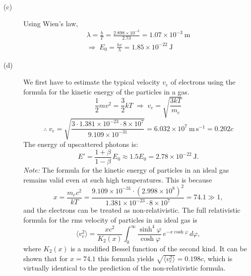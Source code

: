 \begin{description}
\item[(c)] Using Wien's law,
  \begin{gather*}
  \lambda = \frac{b}{T} = \frac{2.898 \times 10^{-3}}{2.73}
  = 1.07 \times 10^{-3}~\mathrm{m} \\
  \Longrightarrow\; E_0 = \frac{hc}{\lambda} = 1.85 \times 10^{-22}~\mathrm{J}
  \tag*{(4 points)}
  \end{gather*}

\item[(d)] We first have to estimate the typical velocity $v_e$ of electrons
  using the formula for the kinetic energy of the particles in a gas.
  \[
  \frac{1}{2}mv^2 = \frac{3}{2}kT
  \;\Longrightarrow\;
  v_e = \sqrt{\frac{3kT}{m_e}}
  \]
  \begin{equation*}
  \therefore\; v_e
  = \sqrt{\frac{3 \cdot 1.381 \times 10^{-23} \cdot 8 \times 10^{7}}
               {9.109 \times 10^{-31}}}
  = 6.032 \times 10^{7}~\mathrm{m\,s^{-1}} = 0.202c
  \tag*{(3 points)}
  \end{equation*}
  The energy of upscattered photons is:
  \begin{equation*}
  E' = \frac{1+\beta}{1-\beta}\,E_0 \approx 1.5 E_0
  = 2.78 \times 10^{-22}~\mathrm{J}.
  \tag*{(2 points)}
  \end{equation*}
  \emph{Note:} The formula for the kinetic energy of particles in an ideal gas
  remains valid even at such high temperatures. This is because
  \[
  x = \frac{m_e c^2}{kT}
  = \frac{9.109 \times 10^{-31} \cdot (2.998 \times 10^{8})^2}
         {1.381 \times 10^{-23} \cdot 8 \times 10^{7}}
  = 74.1 \gg 1,
  \]
  and the electrons can be treated as non-relativistic. The full relativistic
  formula for the rms velocity of particles in an ideal gas is
  \[
  \langle v_e^2 \rangle = \frac{xc^2}{K_2(x)}
  \int_0^\infty \frac{\sinh^4\varphi}{\cosh\varphi}\,
  e^{-x\cosh\varphi}\,d\varphi,
  \]
  where $K_2(x)$ is a modified Bessel function of the second kind. It can be
  shown that for $x = 74.1$ this formula yields
  $\sqrt{\langle v_e^2 \rangle} = 0.198c$, which is virtually identical to the
  prediction of the non-relativistic formula.
\end{description}

